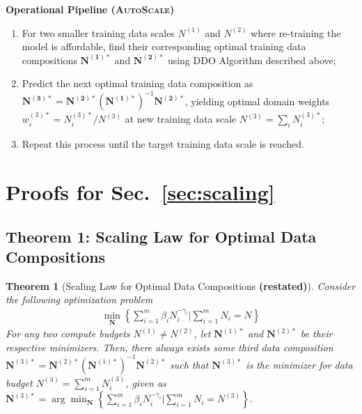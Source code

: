 \documentclass{article} %
\newtheorem{theorem}{Theorem}
\begin{document}
\begin{appendices}{}
\textbf{Operational Pipeline (\textsc{AutoScale})}
\begin{enumerate}

\item For two smaller training data scales $N^{(1)}$ and $N^{(2)}$ where re-training the model is affordable, find their corresponding optimal training data compositions $\mathbf{N^{(1)*}}$ and $\mathbf{N^{(2)*}}$ using \textsc{DDO} Algorithm described above;

\item Predict the next optimal training data composition as $\mathbf{N^{(3)*}} = \mathbf{N^{(2)*}}(\mathbf{N^{(1)*}})^{-1}\mathbf{N^{(2)*}}$, yielding optimal domain weights $w_i^{(3)*}=N_i^{(3)*}/N^{(3)}$ at new training data scale $N^{(3)}=\sum_i N_i^{(3)*}$;
\item Repeat this process until the target training data scale is reached.
\end{enumerate}



\section{Proofs for Sec.~\ref{sec:scaling}}
\label{sec:appendix_proofs}


\subsection{Theorem 1: Scaling Law for Optimal Data Compositions}\label{app:lemma1}
\renewcommand{\thetheorem}{1}
\begin{theorem} [Scaling Law for Optimal Data Compositions \textbf{(restated)}]
    Consider the following optimization problem
    \begin{align*}
        \min_{\mathbf{N}} \left\{ \sum_{i=1}^m \beta_i N_i^{-\gamma_i} \Bigg| \sum_{i=1}^m N_i = N \right\}
    \end{align*}
    For any two compute budgets $N^{(1)} \neq N^{(2)}$, let $\mathbf{N}^{(1)*}$ and $\mathbf{N}^{(2)*}$ be their respective minimizers. 
    Then, there always exists some third data composition $ \mathbf{N}^{(3)*} = \mathbf{N}^{(2)*}(\mathbf{N}^{(1)*}) ^{-1} \mathbf{N}^{(2)*}$ such that $\mathbf{N}^{(3)*}$ is the minimizer for data budget $N^{(3)}=\sum_{i=1}^m N^{(3)}_i$, given as 
         $
        \mathbf{N}^{(3)*} = \arg\min_{\mathbf{N}} \left\{ \sum_{i=1}^m \beta_i N_i^{-\gamma_i} \Bigg| \sum_{i=1}^m N_i = N^{(3)} \right\}.
    $
\end{theorem}



\end{appendices}
\end{document}
